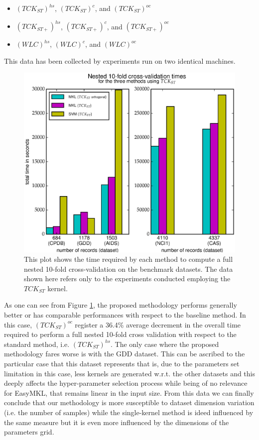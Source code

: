 \begin{itemize}
    \item $(TCK_{ST})^{hs}$, $(TCK_{ST})^c$, and $(TCK_{ST})^{oc}$
    \item $(TCK_{ST+})^{hs}$, $(TCK_{ST+})^c$, and $(TCK_{ST+})^{oc}$
    \item $(WLC)^{hs}$, $(WLC)^c$, and $(WLC)^{oc}$
\end{itemize}

This data has been collected by experiments run on two identical machines.

\begin{figure}[ht]
    \centering
    \includegraphics[scale=0.7]{Figures/total_times}
    \caption{
        This plot shows the time required by each method to compute a full nested 10-fold cross-validation on the benchmark datasets.
        The data shown here refers only to the experiments conducted employing the $TCK_{ST}$ kernel.
    }
    \label{fig:datasetstimes}
\end{figure}

As one can see from Figure \ref{fig:datasetstimes}, the proposed methodology performs generally
better or has comparable performances with respect to the baseline method.
In this case, $(TCK_{ST})^{oc}$ register a 36.4\% average
decrement in the overall time required to perform a full nested 10-fold cross
validation with respect to the standard method, i.e. $(TCK_{ST})^{hs}$.
The only case where the proposed methodology fares worse is with the GDD dataset.
This can be ascribed to the particular case that this dataset represents that is, due to the parameters
set limitation in this case, less kernels are generated w.r.t. the other datasets
and this deeply affects the hyper-parameter selection process while being of no relevance for
EasyMKL, that remains linear in the input size.
From this data we can finally conclude that our methodology is more susceptible
to dataset dimension variation (i.e. the number of samples) while the single-kernel
method is ideed influenced by the same measure but it is even more influenced by
the dimensions of the parameters grid.


